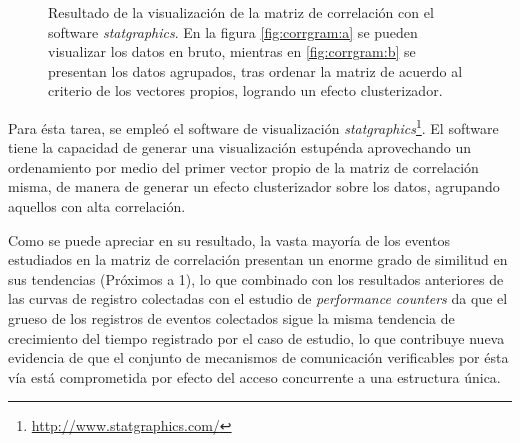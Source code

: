 \begin{figure}[h!]
	\centering
	\hspace*{\fill}
	\hfill
	\caption{Resultado de la visualización de la matriz de correlación con el software \emph{statgraphics}. En la figura \ref{fig:corrgram:a} se pueden visualizar los datos en bruto, mientras en \ref{fig:corrgram:b} se presentan los datos agrupados, tras ordenar la matriz de acuerdo al criterio de los vectores propios, logrando un efecto clusterizador.}
	\label{fig:corrmatrix}
	\hspace*{\fill}
\end{figure}


Para ésta tarea, se empleó el software de visualización \emph{statgraphics}\footnote{\url{http://www.statgraphics.com/}}. El software tiene la capacidad de generar una visualización estupénda aprovechando un ordenamiento por medio del primer vector propio de la matriz de correlación misma, de manera de generar un efecto clusterizador sobre los datos, agrupando aquellos con alta correlación.

Como se puede apreciar en su resultado, la vasta mayoría de los eventos estudiados en la matriz de correlación presentan un enorme grado de similitud en sus tendencias (Próximos a 1), lo que combinado con los resultados anteriores de las curvas de registro colectadas con el estudio de \emph{performance counters} da que el grueso de los registros de eventos colectados sigue la misma tendencia de crecimiento del tiempo registrado por el caso de estudio, lo que contribuye nueva evidencia de que el conjunto de mecanismos de comunicación verificables por ésta vía está comprometida por efecto del acceso concurrente a una estructura única.

